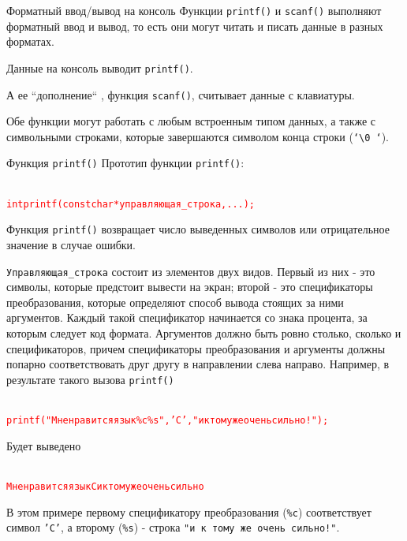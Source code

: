 \documentclass[xcolor=table]{beamer}
\begin{document}
\begin{frame}{Форматный ввод/вывод на консоль}
    Функции \texttt{printf()} и \texttt{scanf()} выполняют форматный ввод и вывод, то есть они могут читать и писать данные в разных форматах.
    
    Данные на консоль выводит \texttt{printf()}.
    
    \medskip
    А ее ``дополнение`` , функция \texttt{scanf()}, считывает данные с клавиатуры.
    
    \medskip
    Обе функции могут работать с любым встроенным типом данных, а также с символьными строками, которые завершаются символом конца строки (\texttt{`\backslash 0 `}).
\end{frame}

\begin{frame}{Функция \texttt{printf()}}
    Прототип функции \texttt{printf()}:
    
    \begin{alltt}
    \textcolor{red}{
    int printf(const char *управляющая\_строка, ...);
    }
    \end{alltt}
    
    Функция \texttt{printf()} возвращает число выведенных символов или отрицательное значение в случае ошибки.
    
    \texttt{Управляющая\_строка} состоит из элементов двух видов. Первый из них - это символы, которые предстоит вывести на экран; второй - это спецификаторы преобразования, которые определяют способ вывода стоящих за ними аргументов. Каждый такой спецификатор начинается со знака процента, за которым следует код формата. Аргументов должно быть ровно столько, сколько и спецификаторов, причем спецификаторы преобразования и аргументы должны попарно соответствовать друг другу в направлении слева направо. Например, в результате такого вызова \texttt{printf()}
    
    \begin{alltt}
    \textcolor{red}{
    printf("Мне нравится язык \%c \%s", 'C', "и к тому же очень сильно!");
    }
    \end{alltt}
    
    Будет выведено
    
    \begin{alltt}
    \textcolor{red}{
    Мне нравится язык С и к тому же очень сильно
    }
    \end{alltt}
    
    В этом примере первому спецификатору преобразования (\texttt{\%c}) соответствует символ \texttt{'C'}, а второму (\texttt{\%s}) - строка \texttt{"и к тому же очень сильно!"}.
\end{frame}
\end{document}
